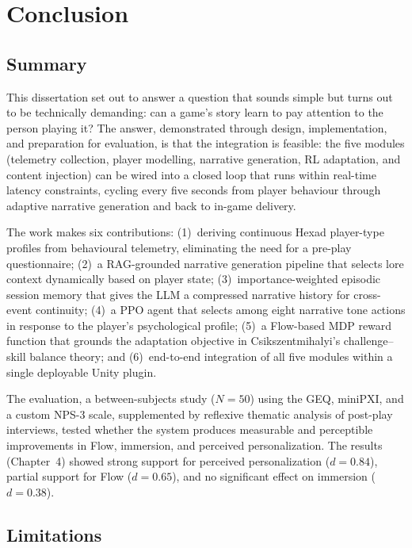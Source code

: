 \chapter{Conclusion}

\section{Summary}

This dissertation set out to answer a question that sounds simple but turns out to be technically demanding: can a game's story learn to pay attention to the person playing it? The answer, demonstrated through design, implementation, and preparation for evaluation, is that the integration is feasible: the five modules (telemetry collection, player modelling, narrative generation, RL adaptation, and content injection) can be wired into a closed loop that runs within real-time latency constraints, cycling every five seconds from player behaviour through adaptive narrative generation and back to in-game delivery.

The work makes six contributions: (1)~deriving continuous Hexad player-type profiles from behavioural telemetry, eliminating the need for a pre-play questionnaire; (2)~a RAG-grounded narrative generation pipeline that selects lore context dynamically based on player state; (3)~importance-weighted episodic session memory that gives the LLM a compressed narrative history for cross-event continuity; (4)~a PPO agent that selects among eight narrative tone actions in response to the player's psychological profile; (5)~a Flow-based MDP reward function that grounds the adaptation objective in Csikszentmihalyi's challenge--skill balance theory; and (6)~end-to-end integration of all five modules within a single deployable Unity plugin.

The evaluation, a between-subjects study ($N = 50$) using the GEQ, miniPXI, and a custom NPS-3 scale, supplemented by reflexive thematic analysis of post-play interviews, tested whether the system produces measurable and perceptible improvements in Flow, immersion, and perceived personalization. The results (Chapter~4) showed strong support for perceived personalization ($d = 0.84$), partial support for Flow ($d = 0.65$), and no significant effect on immersion ($d = 0.38$).

\section{Limitations}

